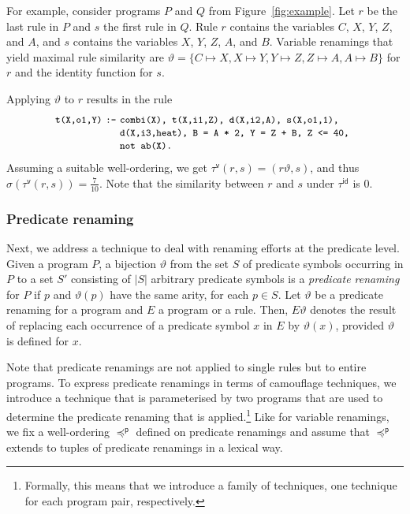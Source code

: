 \documentclass{tlp}
\newcommand{\camouv}{\tau^\mathsf{v}}
\newcommand{\preceqp}{\preceq^\mathsf{p}}
\newcommand{\subst}{\vartheta}
\newcommand{\identity}{\tau^{\mathsf{id}}}
\begin{document}
For example, consider programs $P$ and $Q$ from Figure~\ref{fig:example}.  Let $r$ be the last rule  in  $P$ and $s$ the first 
rule in $Q$.
Rule $r$ contains the variables $C$, $X$, $Y$, $Z$, and $A$, and $s$ contains the variables $X$, $Y$, $Z$, $A$, and $B$. 
Variable renamings  that yield maximal rule similarity are
\(\subst = \{
C \mapsto X,
X \mapsto Y,
Y \mapsto Z,
Z \mapsto A,
A \mapsto B
\}\) for $r$ and the identity function for $s$. 

Applying $\subst$ to $r$ results in the rule
\[
\begin{array}{r@{~}c@{~}l}
      \texttt{\small t(X,o1,Y)}& \texttt{\small :-} & \texttt{\small combi(X), t(X,i1,Z), d(X,i2,A), s(X,o1,1),}\\ 
& & \texttt{\small d(X,i3,heat), B = A * 2, Y = Z + B, Z <= 40, }\\
&& \texttt{\small not ab(X).}
\end{array}
\]
Assuming a suitable well-ordering, we get $\camouv(r,s) = (r\subst,s)$, and thus
$\sigma(\camouv(r,s)) = \frac{7}{10}$.
Note that the similarity between $r$ and $s$ under $\identity$ is  $0$. 

\subsubsection{Predicate renaming}
Next, we address a technique to deal with renaming efforts at the predicate level. 
Given a program $P$,  a bijection $\subst$ from the set $S$ of predicate symbols occurring  in $P$  to  a set $S'$
consisting of $|S|$ arbitrary predicate symbols is a \emph{predicate renaming} for $P$ if
$p$ and $\subst(p)$ have the same arity, 
for each $p \in S$.
Let $\subst$ be a predicate renaming for a program and $E$
a program or a rule. Then, $E\subst$ denotes the result of 
replacing each occurrence of a predicate symbol $x$ in $E$ by $\subst(x)$, provided $\subst$ is defined for $x$.  

Note that predicate renamings are not applied to single rules but to entire programs.
To express predicate renamings in terms of camouflage techniques, we 
introduce a  technique that is parameterised by two programs that are used to determine
 the predicate renaming that is applied.\footnote{Formally, this means that we introduce a family of techniques, one technique for each  program pair, respectively.}
Like for variable renamings, we fix a well-ordering $\preceqp$ defined on predicate renamings
and assume that  $\preceqp$ extends to tuples of predicate renamings in a lexical way.
\end{document}
